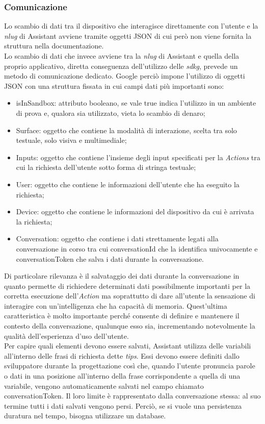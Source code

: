 		\subsubsection{Comunicazione}
		Lo scambio di dati tra il dispositivo che interagisce direttamente con l'utente e la \emph{\gls{nlug}} di Assistant avviene tramite oggetti JSON di cui però non viene fornita la struttura nella documentazione. \\
		Lo scambio di dati che invece avviene tra la \emph{\gls{nlug}} di Assistant e quella della proprio applicativo, diretta conseguenza dell'utilizzo delle \emph{\gls{sdkg}}, prevede un metodo di comunicazione dedicato. Google perciò impone l'utilizzo di oggetti JSON con una struttura fissata in cui campi dati più importanti sono:
		\begin{itemize}
			\item isInSandbox: attributo booleano, se vale true indica l'utilizzo in un ambiente di prova e, qualora sia utilizzato, vieta lo scambio di denaro;
			\item Surface: oggetto che contiene la modalità di interazione, scelta tra solo testuale, solo visiva e multimediale;
			\item Inputs: oggetto che contiene l'insieme degli input specificati per la \emph{Actions} tra cui la richiesta dell'utente sotto forma di stringa testuale;
			\item User: oggetto che contiene le informazioni dell'utente che ha eseguito la richiesta;
			\item Device: oggetto che contiene le informazioni del dispositivo da cui è arrivata la richiesta;
			\item Conversation: oggetto che contiene i dati strettamente legati alla conversazione in corso tra cui conversationId che la identifica univocamente e conversationToken che salva i dati durante la conversazione.
		\end{itemize}
		Di particolare rilevanza è il salvataggio dei dati durante la conversazione in quanto permette di richiedere determinati dati possibilmente importanti per la corretta esecuzione dell'\emph{Action} ma soprattutto di dare all'utente la sensazione di interagire con un'intelligenza che ha capacità di memoria. Quest'ultima caratteristica è molto importante perché consente di definire e mantenere il contesto della conversazione, qualunque esso sia, incrementando notevolmente la qualità dell'esperienza d'uso dell'utente. \\
		Per capire quali elementi devono essere salvati, Assistant utilizza delle variabili all'interno delle frasi di richiesta dette \emph{tips}. Essi devono essere definiti dallo sviluppatore durante la progettazione così che, quando l'utente pronuncia parole o dati in una posizione all'interno della frase corrispondente a quella di una variabile, vengono automaticamente salvati nel campo chiamato conversationToken. Il loro limite è rappresentato dalla conversazione stessa: al suo termine tutti i dati salvati vengono persi. Perciò, se si vuole una persistenza duratura nel tempo, bisogna utilizzare un database.
